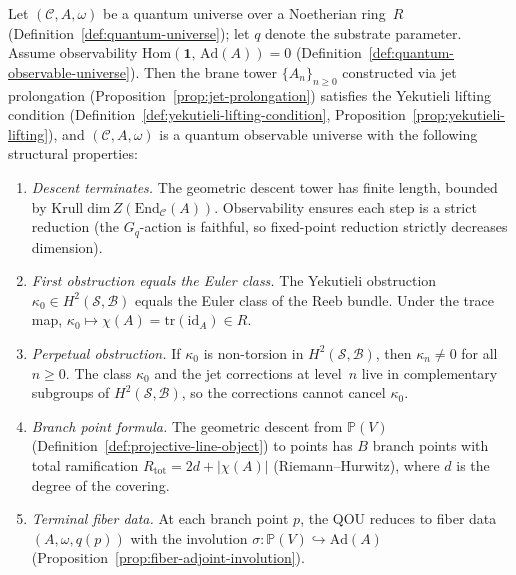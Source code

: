 \begin{theorem}
\label{thm:qu-to-qou}
Let $(\mathcal{C}, A, \omega)$ be a quantum universe over a Noetherian
ring~$R$ (Definition~\ref{def:quantum-universe}); let $q$ denote the substrate parameter.  Assume observability
$\mathrm{Hom}(\mathbf{1},\, \mathrm{Ad}(A)) = 0$
(Definition~\ref{def:quantum-observable-universe}).  Then the brane tower
$\{A_n\}_{n \geq 0}$ constructed via jet prolongation
(Proposition~\ref{prop:jet-prolongation}) satisfies the Yekutieli lifting
condition (Definition~\ref{def:yekutieli-lifting-condition},
Proposition~\ref{prop:yekutieli-lifting}), and $(\mathcal{C}, A, \omega)$
is a quantum observable universe with the following structural properties:
\begin{enumerate}
  \item \emph{Descent terminates.}  The geometric descent tower has finite
        length, bounded by $\mathrm{Krull\;dim}\,
        Z(\mathrm{End}_{\mathcal{C}}(A))$.  Observability ensures each step
        is a strict reduction (the $G_q$-action is faithful, so fixed-point
        reduction strictly decreases dimension).
  \item \emph{First obstruction equals the Euler class.}  The Yekutieli
        obstruction $\kappa_0 \in H^2(\mathcal{S}, \mathcal{B})$ equals the
        Euler class of the Reeb bundle.  Under the trace map,
        $\kappa_0 \mapsto \chi(A) = \mathrm{tr}(\mathrm{id}_A) \in R$.
  \item \emph{Perpetual obstruction.}  If $\kappa_0$ is non-torsion in
        $H^2(\mathcal{S}, \mathcal{B})$, then $\kappa_n \neq 0$ for all
        $n \geq 0$.  The class $\kappa_0$ and the jet corrections at
        level~$n$ live in complementary subgroups of
        $H^2(\mathcal{S}, \mathcal{B})$, so the corrections cannot cancel
        $\kappa_0$.
  \item \emph{Branch point formula.}  The geometric descent from
        $\mathbb{P}(V)$ (Definition~\ref{def:projective-line-object}) to
        points has $B$ branch points with total ramification
        $R_{\mathrm{tot}} = 2d + \lvert\chi(A)\rvert$ (Riemann--Hurwitz),
        where $d$ is the degree of the covering.
  \item \emph{Terminal fiber data.}  At each branch point $p$, the QOU
        reduces to fiber data $(A, \omega, q(p))$ with the involution
        $\sigma \colon \mathbb{P}(V) \hookrightarrow \mathrm{Ad}(A)$
        (Proposition~\ref{prop:fiber-adjoint-involution}).
\end{enumerate}
\end{theorem}

